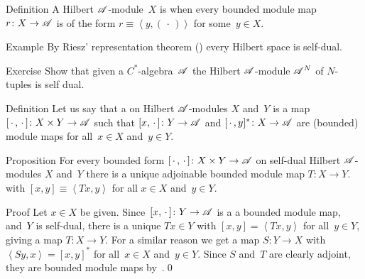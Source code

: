 \documentclass[a]{subfiles}
\begin{document}
\begin{parsec}%
\begin{point}{Definition}%
A Hilbert $\mathscr{A}$-module~$X$ is %
when every bounded module map $r\colon X\to \mathscr{A}$
is of the form $r\equiv \left<y,(\,\cdot\,)\right>$
for some~$y\in X$.
\end{point}
\begin{point}{Example}%
By Riesz' representation theorem ()
every Hilbert space is self-dual.
\end{point}
\begin{point}{Exercise}%
Show that given a $C^*$-algebra~$\mathscr{A}$
the Hilbert $\mathscr{A}$-module $\mathscr{A}^{N}$
of $N$-tuples is self dual.
\end{point}
\begin{point}{Definition}%
Let us say that a %
%
on Hilbert $\mathscr{A}$-modules
$X$ and~$Y$
is a map $[\,\cdot\,,\,\cdot\,]\colon X\times Y\to \mathscr{A}$
such that $[x,\,\cdot\,]\colon Y\to \mathscr{A}$
and $[\,\cdot\,,y]^*\colon X\to \mathscr{A}$
are (bounded) module maps for all~$x\in X$ and~$y\in Y$.
\end{point}
\begin{point}{Proposition}%
For every bounded form  $[\,\cdot\,,\,\cdot\,]\colon X\times Y\rightarrow \mathscr{A}$
on self-dual Hilbert $\mathscr{A}$-modules
$X$ and~$Y$
there is a unique adjoinable bounded module map
$T\colon X\to Y$.
with
$[x,y]\equiv \left<Tx,y\right>$
for all $x\in X$ and~$y\in Y$.
\begin{point}{Proof}%
Let $x\in X$ be given.
Since~$[x,\,\cdot\,]\colon Y\to \mathscr{A}$ is a
a bounded module map,
and~$Y$ is self-dual,
there is a unique $Tx\in Y$ with
$[x,y]=\left<Tx,y\right>$
for all~$y\in Y$,
giving a map $T\colon X\to Y$.
For a similar reason
we get a map $S\colon Y\to X$
with $\left<Sy,x\right>=[x,y]^*$ 
for all~$x\in X$ and~$y\in Y$.
Since $S$ and~$T$ are clearly adjoint,
they are bounded module maps by~.\qed
\end{point}
\end{point}
\end{parsec}
\end{document}
